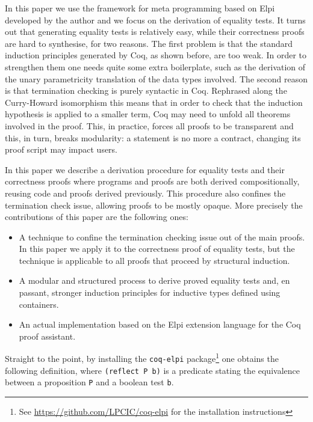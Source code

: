 \documentclass[sigplan,10pt,review]{acmart}\settopmatter{printfolios=true,printccs=false,printacmref=false}
\begin{document}
In this paper we use the framework for meta programming based on
Elpi~\cite{dunchev:hal-01176856,tassi:hal-01637063} developed by the
author and we focus on the derivation of equality tests.
It turns out that generating equality tests is relatively easy,
while their correctness proofs are hard to synthesise, for two reasons. 
The first problem is that 
the standard induction principles generated by Coq, as shown
before, are too weak. In order to strengthen them one needs quite some extra
boilerplate, such as the derivation of the unary parametricity
translation of the data types involved.
The second reason is that termination checking
is purely syntactic in Coq. Rephrased along the Curry-Howard
isomorphism this means that in order to check that the induction
hypothesis is applied to a smaller term, Coq may need to unfold all
theorems involved in the proof. This, in practice, forces all proofs to
be transparent and this, in turn, breaks modularity: a statement is no more a
contract, changing its proof script may impact users.

In this paper we describe a derivation procedure for equality tests
and their correctness proofs
where programs and proofs are both
derived compositionally, reusing code and proofs derived previously.
This procedure also confines the termination check issue,
allowing proofs to be mostly opaque.
More precisely the contributions of this paper are the following ones:
\begin{itemize}
\item A technique to confine the termination checking issue out of the
	main proofs. In this paper we apply it to the correctness
	proof of equality
	tests, but the technique is applicable to all proofs 
	that proceed by structural
	induction.

\item A modular and structured process to derive proved equality tests
		and, en passant, stronger
	induction principles for inductive types defined using
	containers.

\item An actual implementation based on the Elpi extension language
	for the Coq proof assistant.
\end{itemize}

\noindent
Straight to the point, by installing the \lstinline+coq-elpi+
package\footnote{See \url{https://github.com/LPCIC/coq-elpi} for the
installation instructions} 
one obtains the following definition, where \lstinline+(reflect P b)+
is a predicate stating the equivalence between a proposition
\lstinline+P+ and a boolean test \lstinline+b+.
\end{document}
